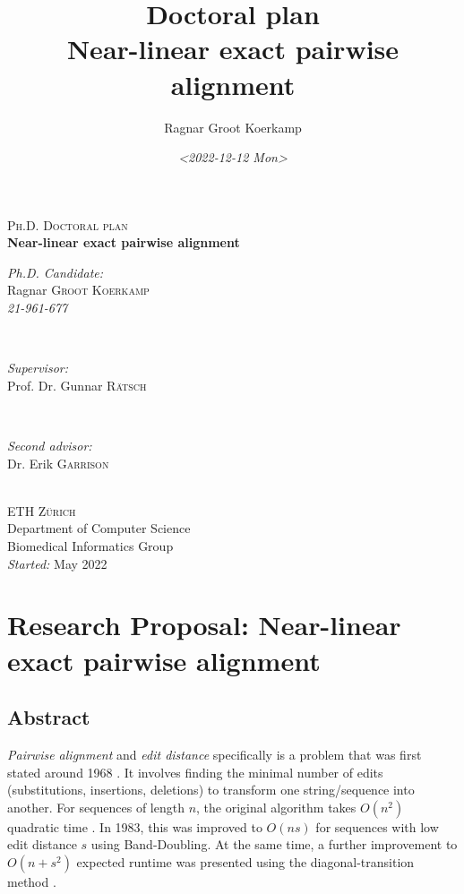\documentclass[11pt,english,a4paper]{article}
\author{Ragnar Groot Koerkamp}
\date{\textit{<2022-12-12 Mon>}}
\title{Doctoral plan\\\medskip
\large Near-linear exact pairwise alignment}
\begin{document}
\renewcommand{\ref}{\cref}
\begin{titlepage}
\center %
\textsc{\LARGE Ph.D. Doctoral plan}\\[1.5cm]
\setlength{\baselineskip}{25pt}
{ \huge \bfseries Near-linear exact pairwise alignment}

\vspace{1.5cm}

\begin{minipage}{0.35\textwidth}
\begin{flushleft} \large
\emph{Ph.D. Candidate:}\\
Ragnar \textsc{Groot Koerkamp} \\
\emph{21-961-677}
\end{flushleft}
\end{minipage}
~
\begin{minipage}{0.34\textwidth}
\begin{center} \large
\emph{Supervisor:} \\
Prof. Dr. Gunnar  \textsc{R\"{a}tsch} \\
\phantom{}
\end{center}
\end{minipage}
~
\begin{minipage}{0.25\textwidth}
\begin{flushright} \large
\emph{Second advisor:} \\
Dr. Erik  \textsc{Garrison} \\
\phantom{}
\end{flushright}
\end{minipage}\\[4cm]
\textsc{ETH Z\"{u}rich} \\
Department of Computer Science\\
Biomedical Informatics Group\\
\emph{Started:} May 2022\\
\vfill
\end{titlepage}

\section{Research Proposal: Near-linear exact pairwise alignment}
\label{sec:orge4142b1}

\subsection{Abstract}
\label{sec:org5ab1fef}
\emph{Pairwise alignment} and \emph{edit distance} specifically is a problem that was
first stated around 1968 \autocite{nw,vintsyuk68}. It involves finding the minimal
number of edits (substitutions, insertions, deletions) to transform one string/sequence
into another.
For sequences of length \(n\), the original algorithm takes \(O(n^2)\) quadratic
time \autocite{sellers}.
In 1983, this was improved to \(O(ns)\) for sequences with low edit distance \(s\)
using Band-Doubling. At the same time, a further improvement to
\(O(n+s^2)\) expected runtime was presented using the diagonal-transition method \autocite{ukkonen83,ukkonen85,myers86}.
\end{document}
